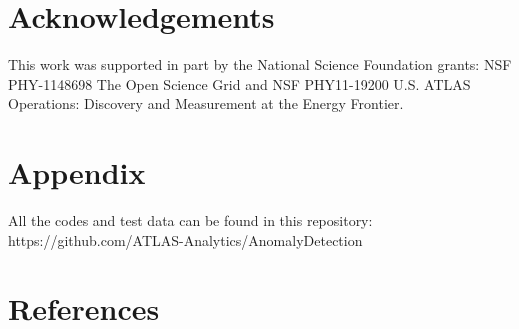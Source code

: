 \documentclass[5p]{elsarticle}
\begin{document}
\section{Acknowledgements}

This work was supported in part by the National Science Foundation grants: NSF PHY-1148698 The Open Science Grid and NSF PHY11-19200 U.S. ATLAS Operations: Discovery and Measurement at the Energy Frontier.

\section{Appendix}

All the codes and test data can be found in this repository:\\
https://github.com/ATLAS-Analytics/AnomalyDetection

\section*{References}



\end{document}
